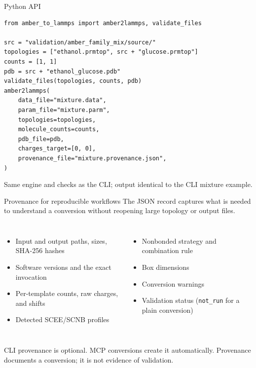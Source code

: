 \documentclass[aspectratio=169,11pt]{beamer}
\begin{document}
\begin{frame}[fragile]{Python API}
\begin{lstlisting}[style=python]
from amber_to_lammps import amber2lammps, validate_files

src = "validation/amber_family_mix/source/"
topologies = ["ethanol.prmtop", src + "glucose.prmtop"]
counts = [1, 1]
pdb = src + "ethanol_glucose.pdb"
validate_files(topologies, counts, pdb)
amber2lammps(
    data_file="mixture.data",
    param_file="mixture.parm",
    topologies=topologies,
    molecule_counts=counts,
    pdb_file=pdb,
    charges_target=[0, 0],
    provenance_file="mixture.provenance.json",
)
\end{lstlisting}
\vspace{-0.3cm}
{\footnotesize Same engine and checks as the CLI; output identical to the CLI mixture example.}
\end{frame}

\begin{frame}{Provenance for reproducible workflows}
The JSON record captures what is needed to understand a conversion without reopening large topology or output files.

\begin{columns}[T,onlytextwidth]
\begin{itemize}
  \item Input and output paths, sizes, SHA-256 hashes
  \item Software versions and the exact invocation
  \item Per-template counts, raw charges, and shifts
  \item Detected SCEE/SCNB profiles
\end{itemize}
\begin{itemize}
  \item Nonbonded strategy and combination rule
  \item Box dimensions
  \item Conversion warnings
  \item Validation status (\texttt{not\_run} for a plain conversion)
\end{itemize}
\end{columns}
\vspace{0.45cm}

CLI provenance is optional. MCP conversions create it automatically. \alert{Provenance documents a conversion; it is not evidence of validation.}
\end{frame}
\end{document}
